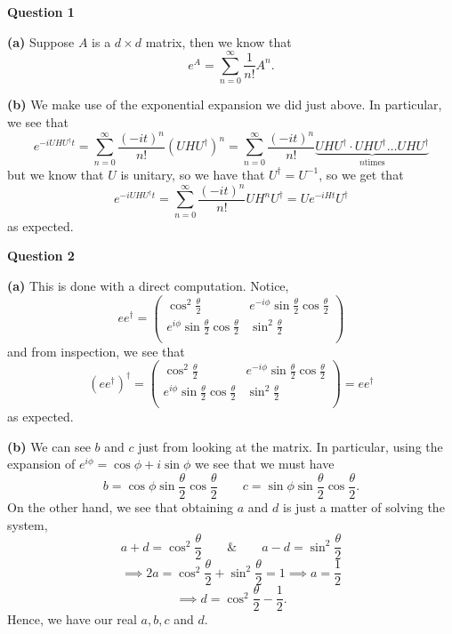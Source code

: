 \documentclass[10pt]{article}
\begin{document}
\textbf{Question 1}

\textbf{(a)} Suppose $A$ is a $d \times d$ matrix, then we know that
\[ e^{A} = \sum_{n=0}^{\infty}\frac{1}{n!}A^{n}. \]

\textbf{(b)} We make use of the exponential expansion we did just above. In particular, we see that
\[ e^{-iUHU^{\dagger}t} = \sum_{n=0}^{\infty}\frac{(-it)^{n}}{n!}(UHU^{\dagger})^{n} = \sum_{n=0}^{\infty}\frac{(-it)^{n}}{n!}\underbrace{UHU^{\dagger}\cdot UHU^{\dagger} \dots UHU^{\dagger}}_{n \text{times}}\]
but we know that $U$ is unitary, so we have that $U^{\dagger} = U^{-1}$, so we get that
\[ e^{-iUHU^{\dagger}t} = \sum_{n=0}^{\infty}\frac{(-it)^{n}}{n!}UH^{n}U^{\dagger} = Ue^{-iHt}U^{\dagger} \]
as expected.

\newpage
\textbf{Question 2}

\textbf{(a)} This is done with a direct computation. Notice,
\[ ee^{\dagger} =
\begin{pmatrix}
  \cos^{2}\frac{\theta}{2} & e^{-i \phi}\sin\frac{\theta}{2}\cos\frac{\theta}{2} \\
  e^{i\phi}\sin\frac{\theta}{2}\cos\frac{\theta}{2} & \sin^{2}\frac{\theta}{2} \\
\end{pmatrix}
\]
and from inspection, we see that
\[ (ee^{\dagger})^{\dagger} =
\begin{pmatrix}
  \cos^{2}\frac{\theta}{2} & e^{-i \phi}\sin\frac{\theta}{2}\cos\frac{\theta}{2} \\
  e^{i\phi}\sin\frac{\theta}{2}\cos\frac{\theta}{2} & \sin^{2}\frac{\theta}{2} \\
\end{pmatrix}
= ee^{\dagger} \]
as expected.

\textbf{(b)} We can see $b$ and $c$ just from looking at the matrix. In particular, using the expansion of $e^{i\phi} = \cos\phi + i\sin\phi$ we see that we must have
\[ b = \cos\phi \sin\frac{\theta}{2} \cos\frac{\theta}{2} \hspace{2em} c = \sin\phi \sin\frac{\theta}{2} \cos\frac{\theta}{2}. \]
On the other hand, we see that obtaining $a$ and $d$ is just a matter of solving the system,
\[ a + d = \cos^{2}\frac{\theta}{2} \hspace{2em} \& \hspace{2em} a - d = \sin^{2}\frac{\theta}{2} \]
\[ \implies 2a = \cos^{2}\frac{\theta}{2} + \sin^{2}\frac{\theta}{2} = 1 \implies a = \frac{1}{2} \]
\[ \implies d = \cos^{2}\frac{\theta}{2} -\frac{1}{2}. \]
Hence, we have our real $a,b,c$ and $d$.
\end{document}

